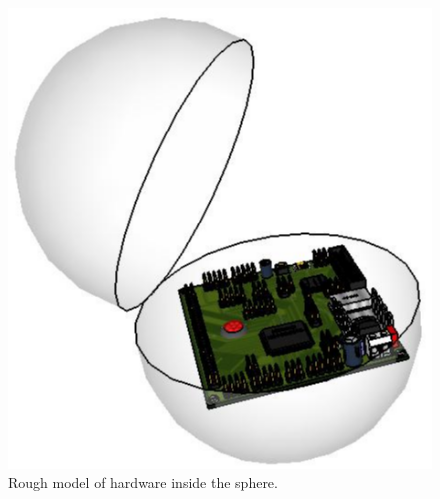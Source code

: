 
\begin{figure}[H]
	\centering
	\includegraphics[scale=0.6]{img/Sphere_001}
	\caption{Rough model of hardware inside the sphere. \label{fig:sphere}}
\end{figure}
